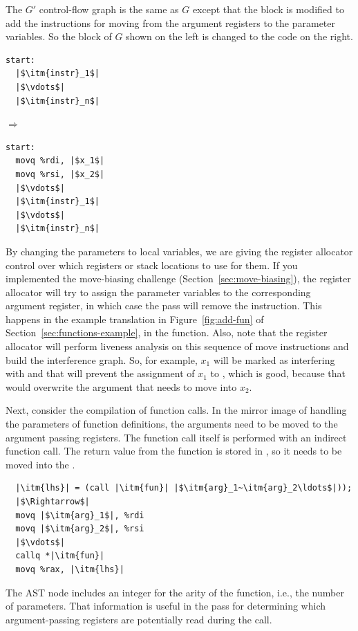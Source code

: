\documentclass[11pt]{book}
\newcommand{\ocaml}[1]{{\color{blue}{#1}}}
\begin{document}
\ocaml{Note that we copy over the function $vars$ environment unchanged.}
The $G'$ control-flow graph is the same as $G$ except that the
 block is modified to add the instructions for moving from
the argument registers to the parameter variables. So the 
block of $G$ shown on the left is changed to the code on the right.
\begin{center}
\begin{minipage}{0.3\textwidth}
\begin{lstlisting}
start:
  |$\itm{instr}_1$|
  |$\vdots$|
  |$\itm{instr}_n$|
\end{lstlisting}
\end{minipage}
$\Rightarrow$
\begin{minipage}{0.3\textwidth}
\begin{lstlisting}
start:
  movq %rdi, |$x_1$|
  movq %rsi, |$x_2$|
  |$\vdots$|
  |$\itm{instr}_1$|
  |$\vdots$|
  |$\itm{instr}_n$|
\end{lstlisting}
\end{minipage}
\end{center}
By changing the parameters to local variables, we are giving the
register allocator control over which registers or stack locations to
use for them. If you implemented the move-biasing challenge
(Section~\ref{sec:move-biasing}), the register allocator will try to
assign the parameter variables to the corresponding argument register,
in which case the  pass will remove the
 instruction. This happens in the example translation in
Figure~\ref{fig:add-fun} of Section~\ref{sec:functions-example}, in
the  function.
%
Also, note that the register allocator will perform liveness analysis
on this sequence of move instructions and build the interference
graph. So, for example, $x_1$ will be marked as interfering with
 and that will prevent the assignment of $x_1$ to
, which is good, because that would overwrite the argument
that needs to move into $x_2$.

Next, consider the compilation of function calls. In the mirror image
of handling the parameters of function definitions, the arguments need
to be moved to the argument passing registers.  The function call
itself is performed with an indirect function call. The return value
from the function is stored in , so it needs to be moved
into the .
\begin{lstlisting}
  |\itm{lhs}| = (call |\itm{fun}| |$\itm{arg}_1~\itm{arg}_2\ldots$|));
  |$\Rightarrow$|
  movq |$\itm{arg}_1$|, %rdi
  movq |$\itm{arg}_2$|, %rsi
  |$\vdots$|
  callq *|\itm{fun}|
  movq %rax, |\itm{lhs}|
\end{lstlisting}
The  AST node includes an integer for the arity of
the function, i.e., the number of parameters. That information is
useful in the  pass for determining which
argument-passing registers are potentially read during the call.
\end{document}
